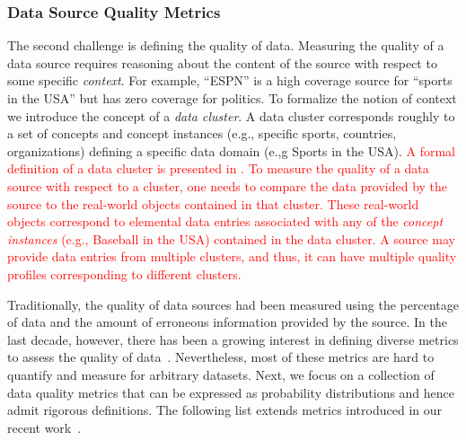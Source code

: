 \documentclass{sig-alternate}
\begin{document}
\subsubsection{Data Source Quality Metrics} 
\label{sec:quality}
The second challenge is defining the quality of data. Measuring the quality of a data source requires reasoning about the content of the source with respect to some specific {\em context}. For example, ``ESPN'' is a high coverage source for ``sports in the USA'' but has zero coverage for politics. To formalize the notion of context we introduce the concept of a {\em data cluster}. A data cluster corresponds roughly to a set of concepts and concept instances (e.g., specific sports, countries, organizations) defining a specific data domain (e.,g Sports in the USA). \textcolor{red}{A formal definition of a data cluster is presented in . To measure the quality of a data source with respect to a cluster, one needs to compare the data provided by the source to the real-world objects contained in that cluster. These real-world objects correspond to elemental data entries associated with any of the {\em concept instances} (e.g., Baseball in the USA) contained in the data cluster. A source may provide data entries from multiple clusters, and thus, it can have multiple quality profiles corresponding to different clusters.}

Traditionally, the quality of data sources had been measured using the percentage of data and the amount of erroneous information provided by the source. In the last decade, however, there has been a growing interest in defining diverse metrics to assess the quality of data~\cite{pipino:2002}. Nevertheless, most of these metrics are hard to quantify and measure for arbitrary datasets. Next, we focus on a collection of data quality metrics that can be expressed as probability distributions and hence admit rigorous definitions. The following list extends metrics introduced in our recent work~\cite{dong:vldb13, rekatsinas:2014}.
\end{document}
